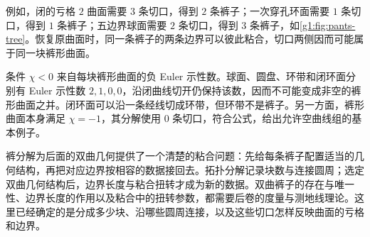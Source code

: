 例如，闭的亏格 \(2\) 曲面需要 \(3\) 条切口，得到 \(2\) 条裤子；一次穿孔环面需要 \(1\) 条切口，得到 \(1\) 条裤子；五边界球面需要 \(2\) 条切口，得到 \(3\) 条裤子，如\cref{g1:fig:pants-tree}。恢复原曲面时，同一条裤子的两条边界可以彼此粘合，切口两侧因而可能属于同一块裤形曲面。

\ProseParagraphBreak

条件 \(\chi<0\) 来自每块裤形曲面的负 Euler 示性数。球面、圆盘、环带和闭环面分别有 Euler 示性数 \(2,1,0,0\)，沿闭曲线切开仍保持该数，因而不可能变成非空的裤形曲面之并。闭环面可以沿一条经线切成环带，但环带不是裤子。另一方面，裤形曲面本身满足 \(\chi=-1\)，其分解使用 \(0\) 条切口，符合公式，给出允许空曲线组的基本例子。

\ProseParagraphBreak

裤分解为后面的双曲几何提供了一个清楚的粘合问题：先给每条裤子配置适当的几何结构，再把对应边界按相容的数据接回去。拓扑分解记录块数与连接圆周；选定双曲几何结构后，边界长度与粘合扭转才成为新的数据。双曲裤子的存在与唯一性、边界长度的作用以及粘合中的扭转参数，都需要后卷的度量与测地线理论。这里已经确定的是分成多少块、沿哪些圆周连接，以及这些切口怎样反映曲面的亏格和边界。
